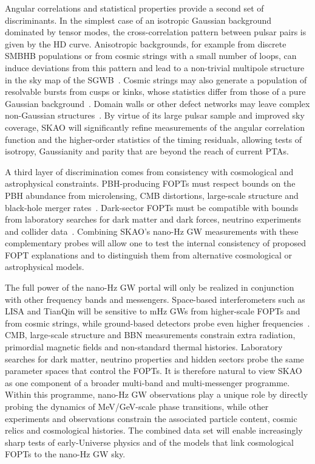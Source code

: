 \documentclass[a4paper,11pt]{article}
\begin{document}
Angular correlations and statistical properties provide a second set of discriminants. In the simplest case 
of an isotropic Gaussian background dominated by tensor modes, the cross-correlation pattern between pulsar 
pairs is given by the HD curve. Anisotropic backgrounds, for example from discrete SMBHB populations or from 
cosmic strings with a small number of loops, can induce deviations from this pattern and lead to a non-trivial 
multipole structure in the sky map of the SGWB~\citep{Gair:2013PTAGW}. Cosmic 
strings may also generate a population of resolvable bursts from cusps or kinks, whose statistics differ from 
those of a pure Gaussian background~\citep{Damour:2000wa,Damour:2001bk,Bohe:2011rk,Servant:2023UHF}. Domain walls 
or other defect networks may leave complex non-Gaussian structures~\citep{Caprini:2009dy}. By virtue of its large pulsar sample and improved sky coverage, SKAO will significantly 
refine measurements of the angular correlation function and the higher-order statistics of the timing residuals, 
allowing tests of isotropy, Gaussianity and parity that are beyond the reach of current PTAs.

A third layer of discrimination comes from consistency with cosmological and astrophysical constraints. 
PBH-producing FOPTs must respect bounds on the PBH abundance from microlensing, CMB distortions, large-scale 
structure and black-hole merger rates~\citep{Carr:2020PBHReview,Gouttenoire:2024PBH,Baker:2025PBHPT,Flores:2024Revisit}. 
Dark-sector FOPTs must be compatible with bounds from laboratory searches for dark matter and dark forces, neutrino 
experiments and collider data~\citep{Ellis:2020awk,Bringmann:2020ura}.
Combining SKAO’s nano-Hz GW measurements with these complementary probes will allow one to test the internal 
consistency of proposed FOPT explanations and to distinguish them from alternative cosmological or astrophysical models.

The full power of the nano-Hz GW portal will only be realized in conjunction with other frequency bands and messengers. 
Space-based interferometers such as LISA and TianQin will be sensitive to mHz GWs from higher-scale FOPTs and from cosmic
strings, while ground-based detectors probe even higher frequencies~\citep{Caprini:2019egz,Servant:2023UHF}.
CMB, large-scale structure and BBN measurements constrain extra radiation, primordial magnetic fields and non-standard 
thermal histories. Laboratory searches for 
dark matter, neutrino properties and hidden sectors probe the same parameter spaces that control the
FOPTs. It is therefore natural to view SKAO as one component of 
a broader multi-band and multi-messenger programme. Within this programme, nano-Hz GW observations play a unique role 
by directly probing the dynamics of MeV/GeV-scale phase transitions, while other experiments and observations constrain 
the associated particle content, cosmic relics and cosmological histories. The combined data set will enable increasingly 
sharp tests of early-Universe physics and of the models that link cosmological FOPTs to the nano-Hz GW sky.
\end{document}
